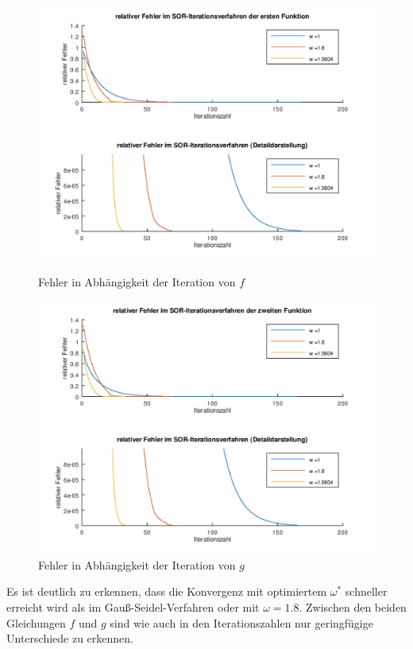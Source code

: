 \documentclass[ %
ngerman, %
a4paper, %
sectionreset, %
chapterstyle=framed, %
sectionstyle=dotted, %
titlefont=osfamily %
]{../../../../texmf/tex/latex/mathscriptMathTUD/mathscriptMathTUD}
\begin{document}
	\begin{figure}
		\centering
		\includegraphics[width=0.75\linewidth]{fehlerplot1.png}
		\caption{Fehler in Abhängigkeit der Iteration von $f$}
		\bigskip \bigskip
		\includegraphics[width=0.75\linewidth]{fehlerplot2.png}
		\caption{Fehler in Abhängigkeit der Iteration von $g$}
	\end{figure}

	Es ist deutlich zu erkennen, dass die Konvergenz mit optimiertem $\omega^\ast$ schneller erreicht wird als im Gauß-Seidel-Verfahren oder mit $\omega = 1.8$. Zwischen den beiden Gleichungen $f$ und $g$ sind wie auch in den Iterationszahlen nur geringfügige Unterschiede zu erkennen.
\end{document}
